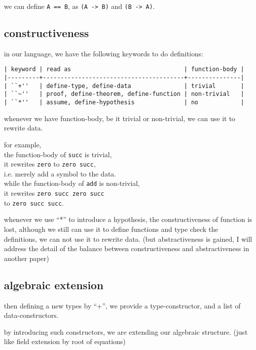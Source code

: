 \documentclass{sigplanconf}
\begin{document}
we can define {\scriptsize\verb|A == B|}, as {\scriptsize\verb|(A -> B)|} and {\scriptsize\verb|(B -> A)|}.

\subsection{constructiveness}

in our language, we have the following keywords to do definitions:

{\scriptsize\begin{verbatim}
| keyword | read as                                | function-body |
|---------+----------------------------------------+---------------|
| ``+''   | define-type, define-data               | trivial       |
| ``~''   | proof, define-theorem, define-function | non-trivial   |
| ``*''   | assume, define-hypothesis              | no            |
\end{verbatim}}

whenever we have function-body, be it trivial or non-trivial,
we can use it to rewrite data.

for example, \\
the function-body of {\scriptsize\verb|succ|} is trivial, \\
it rewrites {\scriptsize\verb|zero|} to {\scriptsize\verb|zero succ|}, \\
i.e. merely add a symbol to the data. \\
while the function-body of {\scriptsize\verb|add|} is non-trivial, \\
it rewrites {\scriptsize\verb|zero succ zero succ|} \\
to {\scriptsize\verb|zero succ succ|}.

whenever we use ``*'' to introduce a hypothesis,
the constructiveness of function is lost,
although we still can use it to define functions
and type check the definitions,
we can not use it to rewrite data.
(but abstractiveness is gained,
I will address the detail of the balance
between constructiveness and abstractiveness in another paper)

\subsection{algebraic extension}

then defining a new types by ``+'',
we provide a type-constructor,
and a list of data-constructors.

by introducing such constructors,
we are extending our algebraic structure.
(just like field extension by root of equations)
\end{document}
